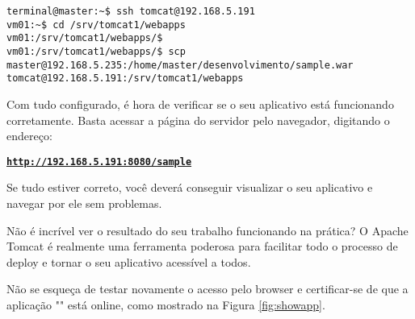 \hypertarget{figura-smaple.war}{}
\begin{lstlisting}[breaklines=true,basicstyle=\ttfamily, 
label=acessosshVm0100 ,
breaklines=true,caption=\firacoderetina Acessar o servidor via ssh e efetuar o deploy via terminal,
postbreak=\mbox{\textcolor{red}{$\hookrightarrow$}\space},
showstringspaces=false]
terminal@master:~$ ssh tomcat@192.168.5.191
vm01:~$ cd /srv/tomcat1/webapps
vm01:/srv/tomcat1/webapps/$
vm01:/srv/tomcat1/webapps/$ scp master@192.168.5.235:/home/master/desenvolvimento/sample.war tomcat@192.168.5.191:/srv/tomcat1/webapps
\end{lstlisting}

Com tudo configurado, é hora de verificar se o seu aplicativo está funcionando corretamente. Basta acessar a página do servidor pelo navegador, digitando o endereço: 
\begin{center}
	\hyperlink{figura-smaple.war}{{\texttt{\textbf{http://192.168.5.191:8080/sample}}}}
\end{center}
Se tudo estiver correto, você deverá conseguir visualizar o seu aplicativo e navegar por ele sem problemas.

Não é incrível ver o resultado do seu trabalho funcionando na prática? O Apache Tomcat é realmente uma ferramenta poderosa para facilitar todo o processo de deploy e tornar o seu aplicativo acessível a todos.

Não se esqueça de testar novamente o acesso pelo browser e certificar-se de que a aplicação "" está online, como mostrado na Figura \ref{fig:showapp}.
